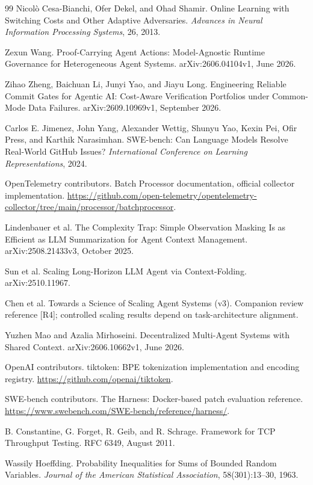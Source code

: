 \begin{thebibliography}{99}
 Nicol\`o Cesa-Bianchi, Ofer Dekel, and Ohad Shamir.
\newblock Online Learning with Switching Costs and Other Adaptive Adversaries.
\newblock \emph{Advances in Neural Information Processing Systems}, 26, 2013.

 Zexun Wang.
\newblock Proof-Carrying Agent Actions: Model-Agnostic Runtime Governance for Heterogeneous Agent Systems.
\newblock arXiv:2606.04104v1, June 2026.

 Zihao Zheng, Baichuan Li, Junyi Yao, and Jiayu Long.
\newblock Engineering Reliable Commit Gates for Agentic AI: Cost-Aware Verification Portfolios under Common-Mode Data Failures.
\newblock arXiv:2609.10969v1, September 2026.

 Carlos E. Jimenez, John Yang, Alexander Wettig, Shunyu Yao, Kexin Pei, Ofir Press, and Karthik Narasimhan.
\newblock SWE-bench: Can Language Models Resolve Real-World GitHub Issues?
\newblock \emph{International Conference on Learning Representations}, 2024.

 OpenTelemetry contributors.
\newblock Batch Processor documentation, official collector implementation.
\newblock \url{https://github.com/open-telemetry/opentelemetry-collector/tree/main/processor/batchprocessor}.

 Lindenbauer et al.
\newblock The Complexity Trap: Simple Observation Masking Is as Efficient as LLM Summarization for Agent Context Management.
\newblock arXiv:2508.21433v3, October 2025.

 Sun et al.
\newblock Scaling Long-Horizon LLM Agent via Context-Folding.
\newblock arXiv:2510.11967.

 Chen et al.
\newblock Towards a Science of Scaling Agent Systems (v3).
\newblock Companion review reference [R4]; controlled scaling results depend on task-architecture alignment.

 Yuzhen Mao and Azalia Mirhoseini.
\newblock Decentralized Multi-Agent Systems with Shared Context.
\newblock arXiv:2606.10662v1, June 2026.

 OpenAI contributors.
\newblock tiktoken: BPE tokenization implementation and encoding registry.
\newblock \url{https://github.com/openai/tiktoken}.

 SWE-bench contributors.
\newblock The Harness: Docker-based patch evaluation reference.
\newblock \url{https://www.swebench.com/SWE-bench/reference/harness/}.

 B. Constantine, G. Forget, R. Geib, and R. Schrage.
\newblock Framework for TCP Throughput Testing.
\newblock RFC 6349, August 2011.

 Wassily Hoeffding.
\newblock Probability Inequalities for Sums of Bounded Random Variables.
\newblock \emph{Journal of the American Statistical Association}, 58(301):13--30, 1963.
\end{thebibliography}
